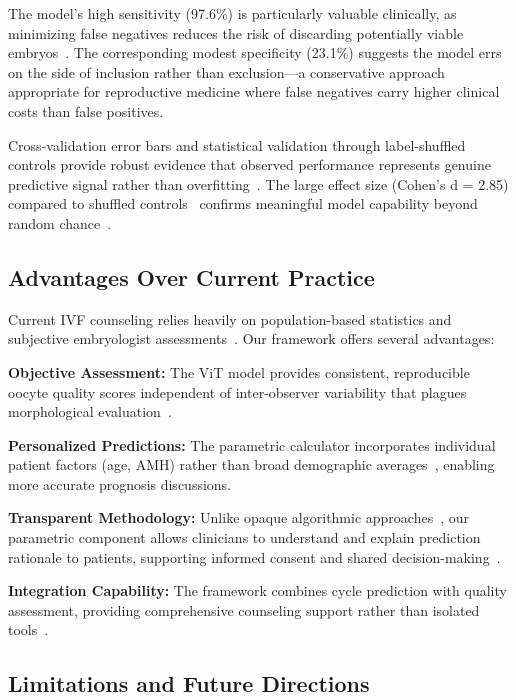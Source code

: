 The model's high sensitivity (97.6\%) is particularly valuable clinically, as minimizing false negatives reduces the risk of discarding potentially viable embryos~\cite{cutting2008elective}. The corresponding modest specificity (23.1\%) suggests the model errs on the side of inclusion rather than exclusion—a conservative approach appropriate for reproductive medicine where false negatives carry higher clinical costs than false positives.

Cross-validation error bars and statistical validation through label-shuffled controls provide robust evidence that observed performance represents genuine predictive signal rather than overfitting~\cite{hastie2009elements}. The large effect size (Cohen's d = 2.85) compared to shuffled controls~\cite{cohen1988statistical} confirms meaningful model capability beyond random chance~\cite{mann1947test}.

\subsection{Advantages Over Current Practice}

Current IVF counseling relies heavily on population-based statistics and subjective embryologist assessments~\cite{asrm2017embryo,racowsky2010standardization}. Our framework offers several advantages:

\textbf{Objective Assessment:} The ViT model provides consistent, reproducible oocyte quality scores independent of inter-observer variability that plagues morphological evaluation~\cite{paternot2009observer,paternot2011multicentre}.

\textbf{Personalized Predictions:} The parametric calculator incorporates individual patient factors (age, AMH) rather than broad demographic averages~\cite{gameiro2023understanding}, enabling more accurate prognosis discussions.

\textbf{Transparent Methodology:} Unlike opaque algorithmic approaches~\cite{rudin2019stop}, our parametric component allows clinicians to understand and explain prediction rationale to patients, supporting informed consent and shared decision-making~\cite{beauchamp2019principles}.

\textbf{Integration Capability:} The framework combines cycle prediction with quality assessment, providing comprehensive counseling support rather than isolated tools~\cite{asrm2021counselors}.

\subsection{Limitations and Future Directions}

